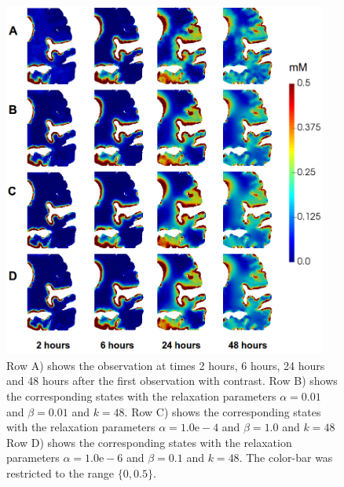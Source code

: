 \documentclass[12pt,a4paper]{article}
\begin{document}
\begin{figure}
\centering
\includegraphics[width=0.95\textwidth]{different.png} 
\caption{Row A) shows the observation at times 2 hours, 6 hours, 24 hours and 48 hours after the first observation with contrast. Row B) shows the corresponding states with the relaxation parameters $\alpha=0.01$ and $\beta=0.01$ and $k=48$.   Row C) shows the corresponding states with the relaxation parameters $\alpha=1.0\mathrm{e-4}$ and $\beta=1.0$ and $k=48$
 Row D) shows the corresponding states with the relaxation parameters $\alpha=1.0\mathrm{e-6}$ and $\beta=0.1$ and $k=48$. The color-bar was restricted to the range $ \lbrace 0 ,0.5 \rbrace$. }
\label{Fig::realdata}
\end{figure}
\end{document}
